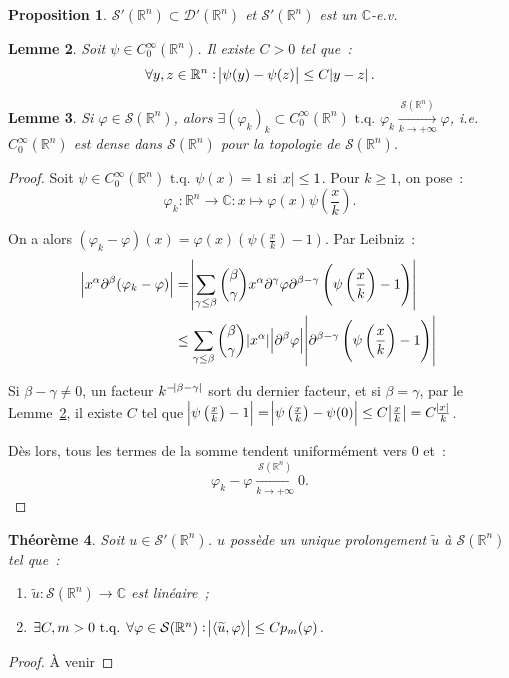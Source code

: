 \documentclass{report}
\newcommand{\C}{{\mathbb C}}
\newcommand{\R}{{\mathbb R}}
\newcommand{\scpr}[2]{\left\langle#1, #2\right\rangle}
\newcommand{\tq}{\text{ t.q. }}
\newcommand{\st}{\tq}
\newcommand{\pinfty}{{+\infty}}
\newtheorem{thm}{Théorème}[chapter]
\newtheorem{prp}[thm]{Proposition}
\newtheorem{lem}[thm]{Lemme}
\theoremstyle{definition}
\theoremstyle{remark}
\begin{document}
\begin{prp} $\mathcal S'(\R^n) \subset \mathcal D'(\R^n)$ et $\mathcal S'(\R^n)$ est un $\C$-e.v.
\end{prp}

\begin{lem}\label{lem:C^infty_0 Lipschitz} Soit $\psi \in C^\infty_0(\R^n)$. Il existe $C > 0$ tel que~:
\[\forall y, z \in \R^n : \abs {\psi(y)-\psi(z)} \leq C\abs {y-z}.\]
\end{lem}


\begin{lem} Si $\varphi \in \mathcal S(\R^n)$, alors $\exists (\varphi_k)_k \subset C^\infty_0(\R^n) \st \varphi_k \xrightarrow[k \to \pinfty]{\mathcal S(\R^n)} \varphi$,
i.e. $C^\infty_0(\R^n)$ est dense dans $\mathcal S(\R^n)$ pour la topologie de $\mathcal S(\R^n)$.
\end{lem}

\begin{proof} Soit $\psi \in C^\infty_0(\R^n) \st \psi(x) = 1$ si $\abs x \leq 1$. Pour $k \geq 1$, on pose~:
\[\varphi_k : \R^n \to \C : x \mapsto \varphi(x)\psi\left(\frac xk\right).\]

On a alors $(\varphi_k-\varphi)(x) = \varphi(x)\left(\psi\left(\frac xk\right)-1\right)$. Par Leibniz~:
\begin{align*}
	\abs {x^\alpha\partial^\beta(\varphi_k-\varphi)}
	&= \abs {\sum_{\gamma \leq \beta}\binom \beta\gamma x^\alpha\partial^\gamma\varphi\partial^{\beta-\gamma}\left(\psi\left(\frac xk\right)-1\right)} \\
	&\leq \sum_{\gamma\leq\beta}\binom\beta\gamma\abs {x^\alpha}\abs {\partial^\beta\varphi}\abs {\partial^{\beta-\gamma}\left(\psi\left(\frac xk\right)-1\right)}
\end{align*}

Si $\beta - \gamma \neq 0$, un facteur $k^{-\abs{\beta-\gamma}}$ sort du dernier facteur, et si $\beta=\gamma$, par le Lemme~\ref{lem:C^infty_0 Lipschitz}, il existe $C$ tel que
$\abs {\psi\left(\frac xk\right)-1} = \abs {\psi\left(\frac xk\right) - \psi(0)} \leq C\abs {\frac xk} = C\frac {\abs x}k$.

Dès lors, tous les termes de la somme tendent uniformément vers 0 et~:
\[\varphi_k-\varphi \xrightarrow[k \to \pinfty]{\mathcal S(\R^n)} 0.\]
\end{proof}

\begin{thm} Soit $u \in \mathcal S'(\R^n)$. $u$ possède un unique prolongement $\widetilde u$ à $\mathcal S(\R^n)$ tel que~:
\begin{enumerate}
	\item $\widetilde u : \mathcal S(\R^n) \to \C$ est linéaire~;
	\item $\exists C, m > 0 \st \forall \varphi \in \mathcal S(\R^n) : \abs {\scpr {\widetilde u}\varphi} \leq Cp_m(\varphi)$.
\end{enumerate}
\end{thm}

\begin{proof} À venir
\end{proof}
\end{document}
